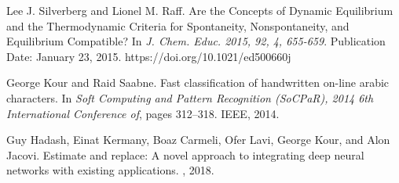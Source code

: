 \documentclass{article}
\begin{document}
  


\begin{thebibliography}{1}

Lee J. Silverberg and Lionel M. Raff.
\newblock Are the Concepts of Dynamic Equilibrium and the Thermodynamic Criteria for Spontaneity, Nonspontaneity, and Equilibrium Compatible?
\newblock In {\em J. Chem. Educ. 2015, 92, 4, 655-659}.
Publication Date: January 23, 2015.
https://doi.org/10.1021/ed500660j


George Kour and Raid Saabne.
\newblock Fast classification of handwritten on-line arabic characters.
\newblock In {\em Soft Computing and Pattern Recognition (SoCPaR), 2014 6th
  International Conference of}, pages 312--318. IEEE, 2014.

Guy Hadash, Einat Kermany, Boaz Carmeli, Ofer Lavi, George Kour, and Alon
  Jacovi.
\newblock Estimate and replace: A novel approach to integrating deep neural
  networks with existing applications.
, 2018.

\end{thebibliography}
\end{document}
